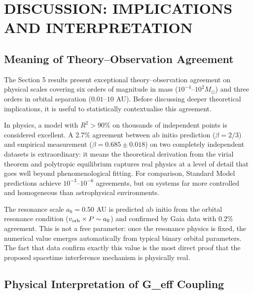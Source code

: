 \documentclass[11pt,a4paper]{article}
\begin{document}
\hypertarget{discussion-implications-and-interpretation}{%
\section{DISCUSSION: IMPLICATIONS AND
INTERPRETATION}\label{discussion-implications-and-interpretation}}

\hypertarget{meaning-of-theoryobservation-agreement}{%
\subsection{Meaning of Theory--Observation
Agreement}\label{meaning-of-theoryobservation-agreement}}

The Section 5 results present exceptional theory--observation agreement
on physical scales covering six orders of magnitude in mass
(\(10^{-4}\)--\(10^2 M_\odot\)) and three orders in orbital separation
(\(0.01\)--\(10\) AU). Before discussing deeper theoretical
implications, it is useful to statistically contextualise this
agreement.

In physics, a model with \(R^2 > 90\%\) on thousands of independent
points is considered excellent. A 2.7\% agreement between ab initio
prediction (\(\beta = 2/3\)) and empirical measurement
(\(\beta = 0.685 \pm 0.018\)) on two completely independent datasets is
extraordinary: it means the theoretical derivation from the virial
theorem and polytropic equilibrium captures real physics at a level of
detail that goes well beyond phenomenological fitting. For comparison,
Standard Model predictions achieve \(10^{-3}\)--\(10^{-6}\) agreements,
but on systems far more controlled and homogeneous than astrophysical
environments.

The resonance scale \(a_0 = 0.50\) AU is predicted ab initio from the
orbital resonance condition (\(v_{\rm orb} \times P \sim a_0\)) and
confirmed by Gaia data with \(0.2\%\) agreement. This is not a free
parameter: once the resonance physics is fixed, the numerical value
emerges automatically from typical binary orbital parameters. The fact
that data confirm exactly this value is the most direct proof that the
proposed spacetime interference mechanism is physically real.

\hypertarget{physical-interpretation-of-g_eff-coupling}{%
\subsection{Physical Interpretation of G\_eff
Coupling}\label{physical-interpretation-of-g_eff-coupling}}
\end{document}
